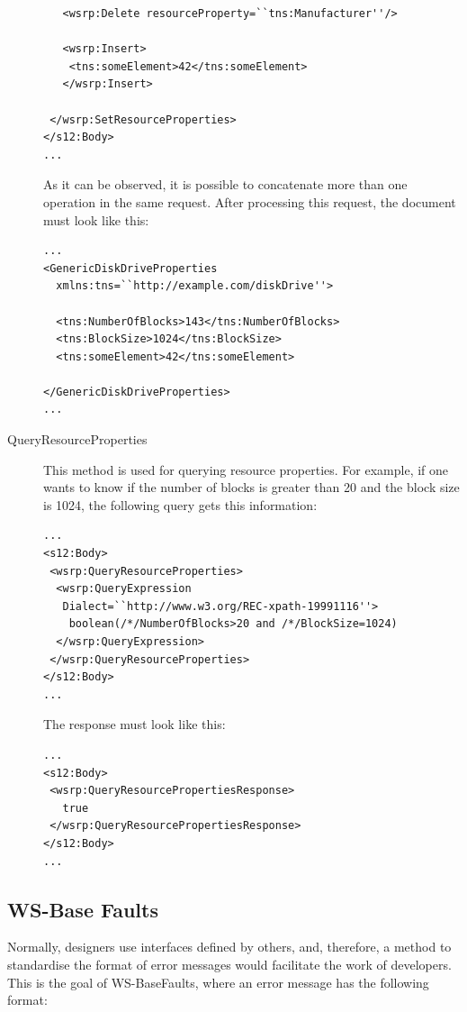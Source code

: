 \begin{description}
\begin{lstlisting}
   <wsrp:Delete resourceProperty=``tns:Manufacturer''/>

   <wsrp:Insert>
    <tns:someElement>42</tns:someElement>
   </wsrp:Insert>

 </wsrp:SetResourceProperties>
</s12:Body>
...
\end{lstlisting}

As it can be observed, it is possible to concatenate more than one operation in the same request. 
After processing this request, the document must look like this:

\lstset{language=XML, numbersep=5pt, frame=single}
\begin{lstlisting}
...
<GenericDiskDriveProperties
  xmlns:tns=``http://example.com/diskDrive''>
  
  <tns:NumberOfBlocks>143</tns:NumberOfBlocks>
  <tns:BlockSize>1024</tns:BlockSize>
  <tns:someElement>42</tns:someElement>

</GenericDiskDriveProperties>
...
\end{lstlisting}

\item[QueryResourceProperties]
This method is used for querying resource properties. 
For example, if one wants to know if the number of blocks is greater than 20 and the block size is 1024,
the following query gets this information:

\lstset{language=XML, numbersep=5pt, frame=single}
\begin{lstlisting}
...
<s12:Body>
 <wsrp:QueryResourceProperties>
  <wsrp:QueryExpression
   Dialect=``http://www.w3.org/REC-xpath-19991116''>
    boolean(/*/NumberOfBlocks>20 and /*/BlockSize=1024)
  </wsrp:QueryExpression>
 </wsrp:QueryResourceProperties>
</s12:Body>
...
\end{lstlisting}

The response must look like this:

\lstset{language=XML, numbersep=5pt, frame=single}
\begin{lstlisting}
...
<s12:Body>
 <wsrp:QueryResourcePropertiesResponse>
   true
 </wsrp:QueryResourcePropertiesResponse>
</s12:Body>
...
\end{lstlisting}

\end{description}

\subsection{WS-Base Faults}
Normally, designers use interfaces defined by others, and, therefore,
a method to standardise the format of error messages would facilitate the work of developers. 
This is the goal of WS-BaseFaults, where an error message has the following format:

